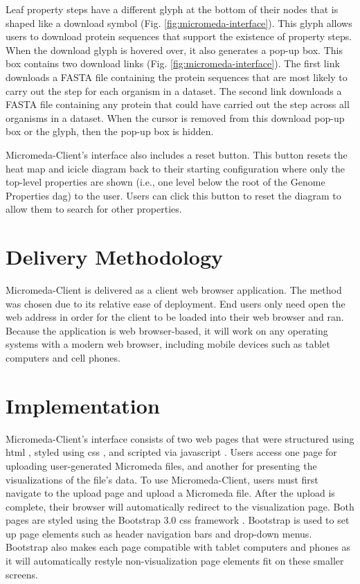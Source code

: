 Leaf property steps have a different glyph at the bottom of their nodes that is shaped like a download symbol (Fig. \ref{fig:micromeda-interface}). This glyph allows users to download protein sequences that support the existence of property steps. When the download glyph is hovered over, it also generates a pop-up box. This box contains two download links (Fig. \ref{fig:micromeda-interface}). The first link downloads a FASTA file containing the protein sequences that are most likely to carry out the step for each organism in a dataset. The second link downloads a FASTA file containing any protein that could have carried out the step across all organisms in a dataset. When the cursor is removed from this download pop-up box or the glyph, then the pop-up box is hidden.

Micromeda-Client's interface also includes a reset button. This button resets the heat map and icicle diagram back to their starting configuration where only the top-level properties are shown (i.e., one level below the root of the Genome Properties \gls{dag}) to the user. Users can click this button to reset the diagram to allow them to search for other properties.

\section{Delivery Methodology} \label{client-delivery-method}

Micromeda-Client is delivered as a client web browser application. The method was chosen due to its relative ease of deployment. End users only need open the web address in order for the client to be loaded into their web browser and ran. Because the application is web browser-based, it will work on any operating systems with a modern web browser, including mobile devices such as tablet computers and cell phones.

\section{Implementation} \label{client-implementation}

Micromeda-Client's interface consists of two web pages that were structured using \gls{html} \cite{HTML5}, styled using \gls{css} \cite{CSS3}, and scripted via \gls{javascript} \cite{flanagan2006javascript}. Users access one page for uploading user-generated Micromeda files, and another for presenting the visualizations of the file's data. To use Micromeda-Client, users must first navigate to the upload page and upload a Micromeda file. After the upload is complete, their browser will automatically redirect to the visualization page. Both pages are styled using the Bootstrap 3.0 \gls{css} framework \cite{spurlock2013bootstrap}. Bootstrap is used to set up page elements such as header navigation bars and drop-down menus. Bootstrap also makes each page compatible with tablet computers and phones as it will automatically restyle non-visualization page elements fit on these smaller screens.

